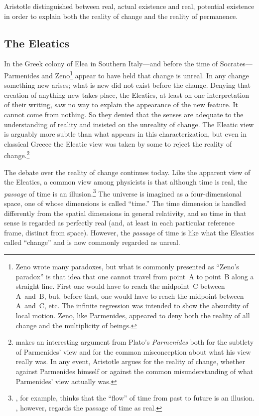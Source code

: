 \documentclass[twocolumn]{article}
\begin{document}
Aristotle distinguished between real, actual existence and real, potential
existence in order to explain both the reality of change and the reality of
permanence.

\subsection{The Eleatics}

In the Greek colony of Elea in Southern Italy---and before the time of
Socrates---Parmenides and Zeno\footnote{%
   Zeno wrote many paradoxes, but what is commonly presented as ``Zeno's
   paradox'' is that idea that one cannot travel from point~A to point~B along
   a straight line.  First one would have to reach the midpoint~C between
   A~and~B, but, before that, one would have to reach the midpoint between
   A~and~C, etc.  The infinite regression was intended to show the absurdity of
   local motion.  Zeno, like Parmenides, appeared to deny both the reality of
   all change and the multiplicity of beings.%
}
appear to have held that change is unreal.  In any change something new arises;
what is new did not exist before the change.  Denying that creation of anything
new takes place, the Eleatics, at least on one interpretation of their writing,
saw no way to explain the appearance of the new feature. It cannot come from
nothing.  So they denied that the senses are adequate to the understanding of
reality and insisted on the unreality of change.  The Eleatic view is arguably
more subtle than what appears in this characterization, but even in classical
Greece the Eleatic view was taken by some to reject the reality of
change.\footnote{%
   \cite{p2017} makes an interesting argument from Plato's {\it Parmenides}
   both for the subtlety of Parmenides' view and for the common misconception
   about what his view really was.  In any event, Aristotle argues for the
   reality of change, whether against Parmenides himself or against the common
   misunderstanding of what Parmenides' view actually was.%
}

The debate over the reality of change continues today.  Like the apparent view
of the Eleatics, a common view among physicists is that although time is real,
the \emph{passage} of time is an illusion.\footnote{%
   \cite{c2015}, for example, thinks that the ``flow'' of time from past to
   future is an illusion. \cite{s2013}, however, regards the passage of time as
   real.%
}
The universe is imagined as a four-dimensional space, one of whose dimensions
is called ``time.''  The time dimension is handled differently from the spatial
dimensions in general relativity, and so time in that sense is regarded as
perfectly real (and, at least in each particular reference frame, distinct from
space).  However, the \emph{passage} of time is like what the Eleatics called
``change'' and is now commonly regarded as unreal.
\end{document}
